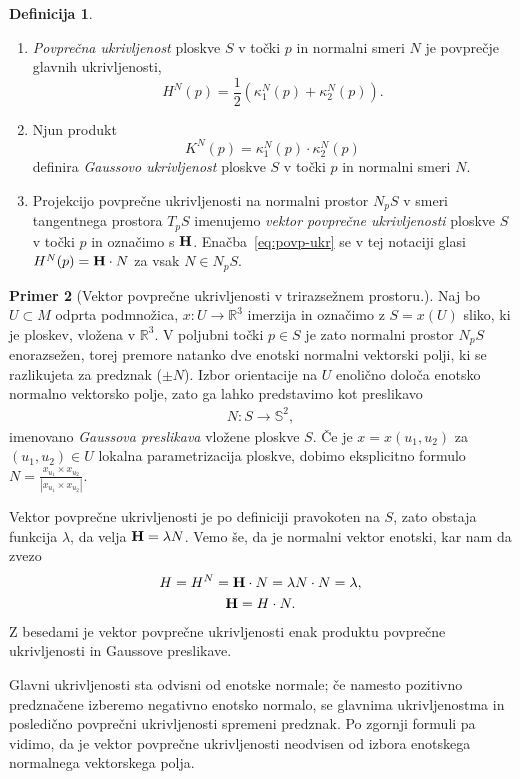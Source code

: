 \documentclass[12pt,a4paper,twoside]{article}
\theoremstyle{definition} %
\newtheorem{definicija}{Definicija}[section]
\newtheorem{primer}[definicija]{Primer}
\theoremstyle{plain} %
\numberwithin{equation}{section}  %
\begin{document}
\begin{definicija}
\begin{enumerate}
\item
\emph{Povprečna ukrivljenost} ploskve $S$ v točki $p$ in normalni smeri $N$ je povprečje glavnih ukrivljenosti,
\begin{equation} \label{eq:povp-ukr}
H^{N}(p) = \frac{1}{2} \left(\kappa _{1}^{N}(p) + \kappa _{2}^{N}(p) \right).
\end{equation}
\item
Njun produkt 
\begin{equation} \label{eq:Gauss-ukr}
K^{N}(p) = \kappa _{1}^{N}(p) \cdot \kappa _{2}^{N}(p)
\end{equation}
definira \emph{Gaussovo ukrivljenost} ploskve $S$ v točki $p$ in normalni smeri $N$.
\item
Projekcijo povprečne ukrivljenosti na normalni prostor $N_{p}S$ v smeri tangentnega prostora $T_{p}S$ imenujemo \emph{vektor povprečne ukrivljenosti} ploskve $S$ v točki $p$ in označimo s $\textbf{\textup{H}}$. Enačba~\eqref{eq:povp-ukr} se v tej notaciji glasi $H^{N}(p) = \textbf{\textup{H}} \cdot N$ za vsak $N \in N_{p}S$.
\end{enumerate}
\end{definicija}

\begin{primer}[Vektor povprečne ukrivljenosti v trirazsežnem prostoru.]
Naj bo $U \subset M$ odprta podmnožica, $x \colon U \to \mathbb{R}^{3}$ imerzija in označimo z $S = x(U)$ sliko, ki je ploskev, vložena v $\mathbb{R}^3$. V poljubni točki $p \in S$ je zato normalni prostor $N_{p}S$ enorazsežen, torej premore natanko dve enotski normalni vektorski polji, ki se razlikujeta za predznak ($\pm N$). Izbor orientacije na $U$ enolično določa enotsko normalno vektorsko polje, zato ga lahko predstavimo kot preslikavo
\begin{gather*}
N \colon S \to \mathbb{S}^{2},
\end{gather*}
imenovano \emph{Gaussova preslikava} vložene ploskve $S$. Če je $x = x(u_{1},u_{2})$ za $(u_{1},u_{2}) \in U$ lokalna parametrizacija ploskve, dobimo eksplicitno formulo $N = \frac{x_{u_{1}} \times x_{u_{2}}}{|x_{u_{1}} \times x_{u_{2}}|}$.

Vektor povprečne ukrivljenosti je po definiciji pravokoten na $S$, zato obstaja funkcija $\lambda$, da velja $\textbf{\textup{H}} = \lambda N$. Vemo še, da je normalni vektor enotski, kar nam da zvezo
\begin{gather}
H = H^{N} = \textbf{\textup{H}} \cdot N = \lambda N \cdot N = \lambda, \nonumber \\
\textbf{\textup{H}} = H \cdot N.
\end{gather}
Z besedami je vektor povprečne ukrivljenosti enak produktu povprečne ukrivljenosti in Gaussove preslikave.

Glavni ukrivljenosti sta odvisni od enotske normale; če namesto pozitivno predznačene izberemo negativno enotsko normalo, se glavnima ukrivljenostma in posledično povprečni ukrivljenosti spremeni predznak. Po zgornji formuli pa vidimo, da je vektor povprečne ukrivljenosti neodvisen od izbora enotskega normalnega vektorskega polja.
\end{primer}
\end{document}
